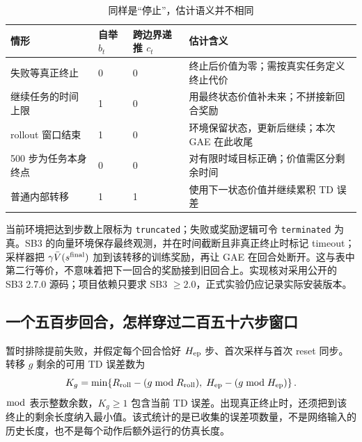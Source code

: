 \documentclass[12pt,fontset=none]{ctexart}
\numberwithin{equation}{section}
\numberwithin{table}{section}
\numberwithin{figure}{section}
\begin{document}
\begin{table}[!ht]
\centering\small
\caption{同样是``停止''，估计语义并不相同}\label{tab:gaet-boundaries}
\begin{tabular}{L{3.2cm}L{2.3cm}L{2.3cm}L{5.0cm}}
\toprule
情形 & 自举 $b_t$ & 跨边界递推 $c_t$ & 估计含义 \\
\midrule
失败等真正终止 & 0 & 0 & 终止后价值为零；需按真实任务定义终止代价 \\
继续任务的时间上限 & 1 & 0 & 用最终状态价值补未来；不拼接新回合奖励 \\
rollout 窗口结束 & 1 & 0 & 环境保留状态，更新后继续；本次 GAE 在此收尾 \\
500 步为任务本身终点 & 0 & 0 & 对有限时域目标正确；价值需区分剩余时间 \\
普通内部转移 & 1 & 1 & 使用下一状态价值并继续累积 TD 误差 \\
\bottomrule
\end{tabular}
\end{table}

当前环境把达到步数上限标为 \texttt{truncated}；失败或奖励逻辑可令 \texttt{terminated} 为真。SB3 的向量环境保存最终观测，并在时间截断且非真正终止时标记 timeout；采样器把 $\gamma\bar V(s^{\rm final})$ 加到该转移的训练奖励，再让 GAE 在回合处断开。这与表中第二行等价，不意味着把下一回合的奖励接到旧回合上\cite{Asb3rollout,Asb3buffer}。实现核对采用公开的 SB3 2.7.0 源码；项目依赖只要求 SB3 $\geq2.0$，正式实验仍应记录实际安装版本。

\subsection{一个五百步回合，怎样穿过二百五十六步窗口}

暂时排除提前失败，并假定每个回合恰好 $H_{\rm ep}$ 步、首次采样与首次 reset 同步。转移 $g$ 剩余的可用 TD 误差数为
\begin{equation}\label{eq:gaet-support}
 K_g=\min\!\left\{
 R_{\rm roll}-(g\bmod R_{\rm roll}),\;
 H_{\rm ep}-(g\bmod H_{\rm ep})
 \right\}.
\end{equation}
$\bmod$ 表示整数余数，$K_g\geq1$ 包含当前 TD 误差。出现真正终止时，还须把到该终止的剩余长度纳入最小值。该式统计的是已收集的误差项数量，不是网络输入的历史长度，也不是每个动作后额外运行的仿真长度。
\end{document}
